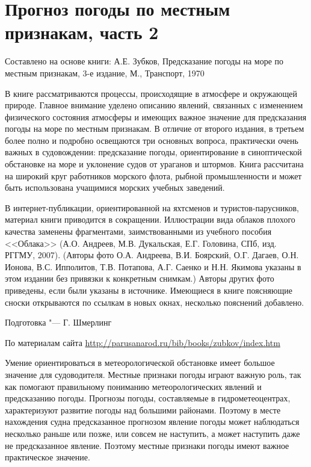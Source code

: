 \section{Прогноз погоды по местным признакам, часть 2}\label{sec:ppmp}

\footnotesize{}

Составлено на основе книги: А.Е. Зубков, Предсказание погоды на море
по местным признакам, 3-е издание, М., Транспорт, 1970

В книге рассматриваются процессы, происходящие в атмосфере и
окружающей природе. Главное внимание уделено описанию явлений,
связанных с изменением физического состояния атмосферы и имеющих
важное значение для предсказания погоды на море по местным
признакам. В отличие от второго издания, в третьем более полно и
подробно освещаются три основных вопроса, практически очень важных в
судовождении: предсказание погоды, ориентирование в синоптической
обстановке на море и уклонение судов от ураганов и штормов. Книга
рассчитана на широкий круг работников морского флота, рыбной
промышленности и может быть использована учащимися морских учебных
заведений.

В интернет-публикации, ориентированной на яхтсменов и
туристов-парусников, материал книги приводится в
сокращении. Иллюстрации вида облаков плохого качества заменены
фрагментами, заимствованными из учебного пособия <<Облака>>
(А.О. Андреев, М.В. Дукальская, Е.Г. Головина, СПб, изд. РГГМУ,
2007). (Авторы фото О.А. Андреева, В.И. Боярский, О.Г. Дагаев,
О.Н. Ионова, В.С. Ипполитов, Т.В. Потапова, А.Г. Саенко и Н.Н. Якимова
указаны в этом издании без привязки к конкретным снимкам.) Авторы
других фото приведены, если были указаны в источнике. Имеющиеся в
книге поясняющие сноски открываются по ссылкам в новых окнах,
несколько пояснений добавлено.

Подготовка "--- Г. Шмерлинг

По материалам сайта \url{http://parusanarod.ru/bib/books/zubkov/index.htm}

\normalsize{}

Умение ориентироваться в метеорологической обстановке имеет большое
значение для судоводителя. Местные признаки погоды играют важную роль,
так как помогают правильному пониманию метеорологических явлений и
предсказанию погоды. Прогнозы погоды, составляемые в гидрометеоцентрах,
характеризуют развитие погоды над большими районами. Поэтому в месте
нахождения судна предсказанное прогнозом явление погоды может
наблюдаться несколько раньше или позже, или совсем не наступить, а
может наступить даже не предсказанное явление. Поэтому местные
признаки погоды имеют важное практическое значение.

